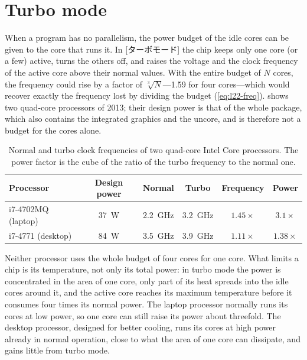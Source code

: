 \documentclass[../main.tex]{subfiles}
\begin{document}
\section{Turbo mode}
\label{sec:l22-turbo}

When a program has no parallelism, the power budget of the idle cores can
be given to the core that runs it.
In [ターボモード] the chip keeps only one core (or a few)
active, turns the others off, and raises the voltage and the clock frequency
of the active core above their normal values.  With the entire budget of $N$
cores, the frequency could rise by a factor of $\sqrt[3]{N}$---1.59 for four
cores---which would recover exactly the frequency lost by dividing the
budget (\cref{eq:l22-freq}).   shows two
quad-core processors of 2013; their design power is
that of the whole package, which also contains the integrated graphics and
the uncore, and is therefore not a budget for the cores alone.

\begin{table}[htbp]
  \centering\small
  \caption{Normal and turbo clock frequencies of two quad-core Intel Core
    processors.  The power factor is the cube of the ratio of the turbo
    frequency to the normal one.}
  \label{tab:l22-turbo}
  \begin{tabular}{@{}lccccc@{}}
    \toprule
    Processor & Design power & Normal & Turbo & Frequency & Power \\
    \midrule
    i7-4702MQ (laptop) & \SI{37}{W} & \SI{2.2}{GHz} & \SI{3.2}{GHz} & $1.45\times$ & $3.1\times$ \\
    i7-4771 (desktop)  & \SI{84}{W} & \SI{3.5}{GHz} & \SI{3.9}{GHz} & $1.11\times$ & $1.38\times$ \\
    \bottomrule
  \end{tabular}
\end{table}

Neither processor uses the whole budget of four cores for one core.  What
limits a chip is its temperature, not only its total power: in turbo mode
the power is concentrated in the area of one core, only part of its heat
spreads into the idle cores around it, and the active core reaches its
maximum temperature before it consumes four times its normal power.  The
laptop processor normally runs its cores at low power, so one core can
still raise its power about threefold.  The desktop processor, designed for
better cooling, runs its cores at high power already in normal operation,
close to what the area of one core can dissipate, and gains little from
turbo mode.
\end{document}

